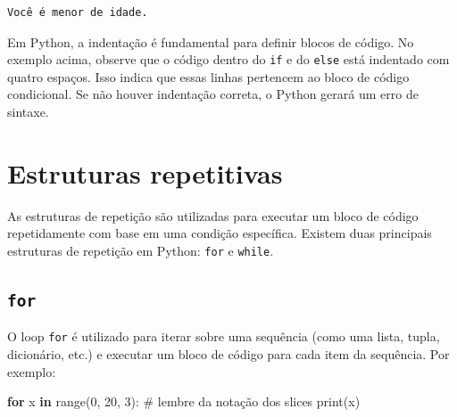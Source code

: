 \documentclass[
  portuguese,
  letterpaper,
  DIV=11,
  numbers=noendperiod]{scrreprt}
\newenvironment{Shaded}{\begin{snugshade}}{\end{snugshade}}
\newcommand{\BuiltInTok}[1]{\textcolor[rgb]{0.00,0.23,0.31}{#1}}
\newcommand{\CommentTok}[1]{\textcolor[rgb]{0.37,0.37,0.37}{#1}}
\newcommand{\ControlFlowTok}[1]{\textcolor[rgb]{0.00,0.23,0.31}{\textbf{#1}}}
\newcommand{\DecValTok}[1]{\textcolor[rgb]{0.68,0.00,0.00}{#1}}
\newcommand{\KeywordTok}[1]{\textcolor[rgb]{0.00,0.23,0.31}{\textbf{#1}}}
\newcommand{\NormalTok}[1]{\textcolor[rgb]{0.00,0.23,0.31}{#1}}
\theoremstyle{definition}
\theoremstyle{remark}
\begin{document}
\begin{verbatim}
Você é menor de idade.
\end{verbatim}

\begin{tcolorbox}[enhanced jigsaw, leftrule=.75mm, opacitybacktitle=0.6, colback=white, coltitle=black, colframe=quarto-callout-tip-color-frame, titlerule=0mm, left=2mm, opacityback=0, breakable, bottomtitle=1mm, toprule=.15mm, title=\textcolor{quarto-callout-tip-color}{\faLightbulb}\hspace{0.5em}{Indentação}, colbacktitle=quarto-callout-tip-color!10!white, arc=.35mm, rightrule=.15mm, bottomrule=.15mm, toptitle=1mm]

Em Python, a indentação é fundamental para definir blocos de código. No
exemplo acima, observe que o código dentro do \texttt{if} e do
\texttt{else} está indentado com quatro espaços. Isso indica que essas
linhas pertencem ao bloco de código condicional. Se não houver
indentação correta, o Python gerará um erro de sintaxe.

\end{tcolorbox}

\section{Estruturas repetitivas}\label{estruturas-repetitivas}

As estruturas de repetição são utilizadas para executar um bloco de
código repetidamente com base em uma condição específica. Existem duas
principais estruturas de repetição em Python: \texttt{for} e
\texttt{while}.

\subsection{\texorpdfstring{\texttt{for}}{for}}\label{for}

O loop \texttt{for} é utilizado para iterar sobre uma sequência (como
uma lista, tupla, dicionário, etc.) e executar um bloco de código para
cada item da sequência. Por exemplo:

\begin{Shaded}
\begin{Highlighting}[]
\ControlFlowTok{for}\NormalTok{ x }\KeywordTok{in} \BuiltInTok{range}\NormalTok{(}\DecValTok{0}\NormalTok{, }\DecValTok{20}\NormalTok{, }\DecValTok{3}\NormalTok{): }\CommentTok{\# lembre da notação dos slices}
    \BuiltInTok{print}\NormalTok{(x)}
\end{Highlighting}
\end{Shaded}
\end{document}
